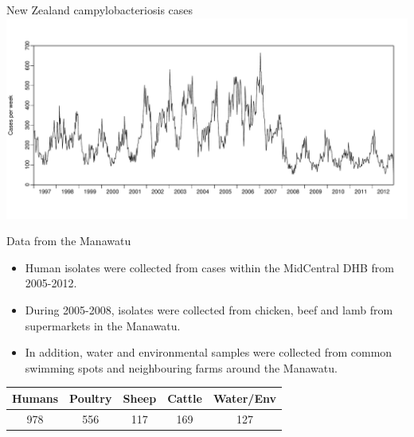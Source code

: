 \documentclass[]{beamer}
\begin{document}
\begin{frame}
\begin{center}
\end{center}
\end{frame}

\begin{frame}{New Zealand campylobacteriosis cases}
\includegraphics[width=1.1\textwidth, trim=60 0 0 40]{Pictures/nz_Cases.pdf}
\end{frame}

\begin{frame}
\begin{center}
\end{center}
\end{frame}

\begin{frame}
\begin{center}
\end{center}
\end{frame}

\begin{frame}{Data from the Manawatu}
\begin{itemize}
\item Human isolates were collected from cases within the MidCentral DHB from 2005-2012.
\gap
\item During 2005-2008, isolates were collected from chicken, beef and lamb from supermarkets in the Manawatu.
\gap
\item In addition, water and environmental samples were collected from common swimming spots and neighbouring farms around the Manawatu.
\end{itemize}
\begin{center}
\begin{tabular}{ccccc}
Humans & Poultry & Sheep & Cattle & Water/Env\\
\hline
978 & 556 & 117 & 169 & 127\\
\end{tabular}
\end{center}
\end{frame}
\end{document}
